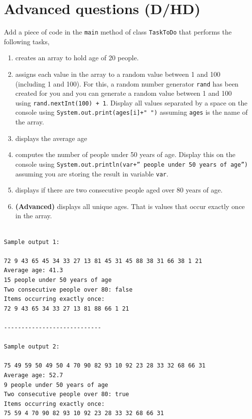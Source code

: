 \newpage

\section*{Advanced questions (D/HD)}

\begin{questions}

\question Add a piece of code in the \texttt{main} method of class \texttt{TaskToDo}  that performs the following tasks,

\begin{enumerate}
\item creates an array to hold age of 20 people. 

\item assigns each value in the array to a random value between 1 and 100 (including 1 and 100). For this, a random number generator \texttt{rand} has been created for you and you can generate a random value between 1 and 100 using \texttt{rand.nextInt(100) + 1}. Display all values separated by a space on the console using \texttt{System.out.print(ages[i]+" ")} assuming \texttt{ages} is the name of the array.

\item displays the average age

\item computes the number of people under 50 years of age. Display this on the console using \texttt{System.out.println(var+'' people under 50 years of age'')} assuming you are storing the result in variable \texttt{var}. 

\item displays if there are two consecutive people aged over 80 years of age.

\item \textbf{(Advanced)} displays all unique ages. That is values that occur exactly once in the array.
\end{enumerate}

\begin{verbatim}

Sample output 1:

72 9 43 65 45 34 33 27 13 81 45 31 45 88 38 31 66 38 1 21 
Average age: 41.3
15 people under 50 years of age
Two consecutive people over 80: false
Items occurring exactly once:
72 9 43 65 34 33 27 13 81 88 66 1 21 

----------------------------

Sample output 2:

75 49 59 50 49 50 4 70 90 82 93 10 92 23 28 33 32 68 66 31 
Average age: 52.7
9 people under 50 years of age
Two consecutive people over 80: true
Items occurring exactly once:
75 59 4 70 90 82 93 10 92 23 28 33 32 68 66 31 
\end{verbatim}


\end{questions}
